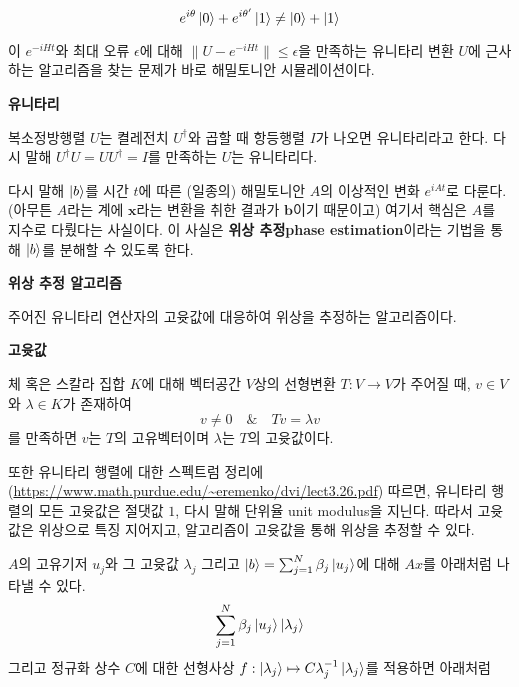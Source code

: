 \documentclass[a4paper,atbegshi,chapter]{oblivoir}
\begin{document}
\begin{mdframed}
\begin{mdframed}
\begin{mdframed}
      \[
        e^{i\theta}\ket0+e^{i\theta'}\ket1 \neq \ket0+\ket1
      \]
    \end{mdframed}
  \end{mdframed}
  이 $e^{-iHt}$와
  최대 오류 $\epsilon$에 대해 $\|U-e^{-iHt}\|\leq\epsilon$을 만족하는
  유니타리 변환 $U$에 근사하는 알고리즘을 찾는 문제가 바로 해밀토니안
  시뮬레이션이다.
  \begin{mdframed}
    \begin{center}\textbf{유니타리}\end{center}
    \noindent 복소정방행렬 $U$는 켤레전치 $U^{\dagger}$와 곱할 때 항등행렬
    $I$가 나오면 유니타리라고 한다. 다시 말해 $U^{\dagger}U=UU^{\dagger}=I$를
    만족하는 $U$는 유니타리다.
  \end{mdframed}
\end{mdframed}
다시 말해 $\ket{b}$를 시간 $t$에 따른 (일종의) 해밀토니안 $A$의 이상적인 변화
$e^{iAt}$로 다룬다. (아무튼 $A$라는 계에 $\mathbf{x}$라는 변환을 취한 결과가 
$\mathbf{b}$이기 때문이고) 여기서 핵심은 $A$를 지수로 다뤘다는 사실이다.
이 사실은 \textbf{위상 추정\footnotesize phase estimation}이라는 기법을 통해
$\ket{b}$를 분해할 수 있도록 한다.
\begin{mdframed}
  \begin{center}\textbf{위상 추정 알고리즘}\end{center}
  \noindent 주어진 유니타리 연산자의 고윳값에 대응하여 위상을 추정하는
  알고리즘이다. 
  \begin{mdframed}
    \begin{center}\textbf{고윳값}\end{center}
    \noindent 체 혹은 스칼라 집합 $K$에 대해 벡터공간 $V$상의 선형변환
    $T:V\rightarrow V$가 주어질 때, $v\in V$와 $\lambda\in K$가 존재하여
    \[
      v\neq 0\quad\&\quad Tv=\lambda v
    \]
    를 만족하면 $v$는 $T$의 고유벡터이며 $\lambda$는 $T$의 고윳값이다.
  \end{mdframed}
  또한 유니타리 행렬에 대한 스펙트럼 정리에 (\url{https://www.math.purdue.edu/~eremenko/dvi/lect3.26.pdf}) 
  따르면, 유니타리 행렬의 모든 고윳값은 절댓값 $1$, 다시 말해 단위율{\footnotesize
  unit modulus}을 지닌다. 따라서 고윳값은 위상으로 특징 지어지고, 알고리즘이
  고윳값을 통해 위상을 추정할 수 있다.
\end{mdframed}
$A$의 고유기저 $u_j$와 그 고윳값 $\lambda_j$ 그리고 $\ket{b}=
\sum_{j=1}^N\beta_j\ket{u_j}$에 대해 $Ax$를 아래처럼 나타낼 수 있다.
\[
  \sum_{j=1}^N\beta_j\ket{u_j}\ket{\lambda_j}
\]
그리고 정규화 상수 $C$에 대한 선형사상 
$f:\ket{\lambda_j}\mapsto C\lambda_j^{-1}\ket{\lambda_j}$를 적용하면 아래처럼
\end{document}
